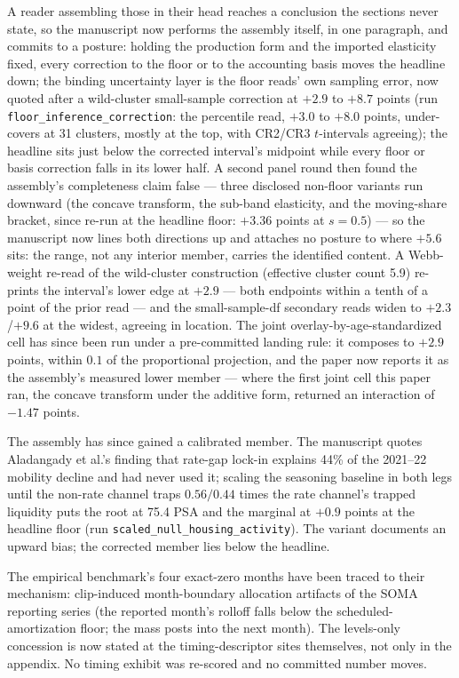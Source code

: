 \documentclass[11pt]{article}
\begin{document}
A reader assembling those in their head reaches a conclusion the sections never state,
so the manuscript now performs the assembly itself, in one paragraph, and commits to a
posture: holding the production form and the imported elasticity fixed, every
correction to the floor or to the accounting basis moves the headline down; the
binding uncertainty layer is the floor reads' own sampling error, now quoted after a
wild-cluster small-sample correction at $+2.9$ to $+8.7$ points (run
\texttt{floor\_inference\_correction}: the percentile read, $+3.0$ to $+8.0$ points,
under-covers at 31 clusters, mostly at the top, with CR2/CR3 $t$-intervals agreeing);
the headline sits just below the corrected interval's midpoint while every floor or
basis correction falls in its lower half. A second panel round then found the
assembly's completeness claim false --- three disclosed non-floor variants run
downward (the concave transform, the sub-band elasticity, and the moving-share
bracket, since re-run at the headline floor: $+3.36$ points at $s=0.5$) --- so the
manuscript now lines both directions up and attaches no posture to where $+5.6$
sits: the range, not any interior member, carries the identified content. A Webb-weight re-read of the wild-cluster construction (effective cluster count 5.9) re-prints the interval's lower edge at $+2.9$ --- both endpoints within a tenth of a point of the prior read --- and the small-sample-df secondary reads widen to $+2.3$/$+9.6$ at the widest, agreeing in location. The joint overlay-by-age-standardized
cell has since been run under a pre-committed landing rule: it composes to $+2.9$
points, within $0.1$ of the proportional projection, and the paper now reports it
as the assembly's measured lower member --- where the first joint cell this paper
ran, the concave transform under the additive form, returned an interaction of
$-1.47$ points.

The assembly has since gained a calibrated member. The manuscript quotes Aladangady
et al.'s finding that rate-gap lock-in explains 44\% of the 2021--22 mobility decline
and had never used it; scaling the seasoning baseline in both legs until the non-rate
channel traps $0.56/0.44$ times the rate channel's trapped liquidity puts the root at
75.4 PSA and the marginal at $+0.9$ points at the headline floor (run
\texttt{scaled\_null\_housing\_activity}). The variant documents an upward bias; the
corrected member lies below the headline.

The empirical benchmark's four exact-zero months have been traced to their
mechanism: clip-induced month-boundary allocation artifacts of the SOMA reporting
series (the reported month's rolloff falls below the scheduled-amortization floor;
the mass posts into the next month). The levels-only concession is now stated at
the timing-descriptor sites themselves, not only in the appendix. No timing
exhibit was re-scored and no committed number moves.
\end{document}
